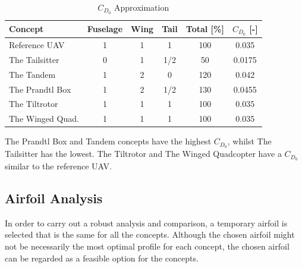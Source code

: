 \begin{table}[h]
    \centering
    \caption{$C_{D_0}$ Approximation}
    \label{tab:cd0estimation}
    \begin{tabular}{lccccc}
        \toprule
        \textbf{Concept}      & \textbf{Fuselage} & \textbf{Wing} & \textbf{Tail} & \textbf{Total [\%]} & \textbf{$C_{D_0}$ [-]} \\\midrule
        Reference UAV         & 1                         & 1                     & 1                     & 100                 & 0.035          \\\hdashline
        The Tailsitter        & 0                         & 1                     & 1/2                   & 50                  & 0.0175         \\\hdashline
        The Tandem            & 1                         & 2                     & 0                     & 120                 & 0.042          \\\hdashline
        The Prandtl Box        & 1                         & 2                     & 1/2                   & 130                 & 0.0455         \\\hdashline
        The Tiltrotor        & 1                         & 1                     & 1                     & 100                 & 0.035          \\\hdashline
        The Winged Quad. & 1                         & 1                     & 1                     & 100                 & 0.035 \\\bottomrule
    \end{tabular}
\end{table}

The Prandtl Box and Tandem concepts have the highest $C_{D_{0}}$, whilst The Tailsitter has the lowest. The Tiltrotor and The Winged Quadcopter have a $C_{D_{0}}$ similar to the reference UAV.

\subsection{Airfoil Analysis}


In order to carry out a robust analysis and comparison, a temporary airfoil is selected that is the same for all the concepts. Although the chosen airfoil might not be necessarily the most optimal profile for each concept, the chosen airfoil can be regarded as a feasible option for the concepts.

